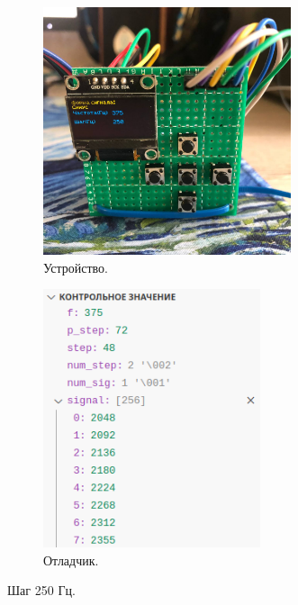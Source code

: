 	\begin{figure}[H]
     \begin{subfigure}[H]{0.5\textwidth}
         \centering
         \includegraphics[width=0.8\textwidth]{../image/test2_u_f.jpg}
         \caption{Устройство.}
     \end{subfigure}
     \hfill
     \begin{subfigure}[H]{0.5\textwidth}
         \centering
         \includegraphics[width=0.7\textwidth]{../image/test2_o_f.png}
         \caption{Отладчик.}
     \end{subfigure}
        \caption{Шаг 250 Гц.}
	\end{figure}
	

